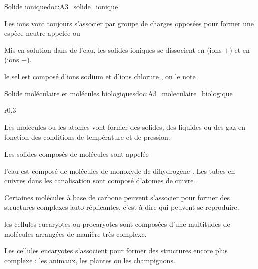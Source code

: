 \begin{doc}{Solide ionique}{doc:A3_solide_ionique}
  \begin{importants}
    Les ions vont toujours s'associer par groupe de charges opposées pour former une espèce neutre appelée  ou 
  \end{importants}
  
  Mis en solution dans de l'eau, les solides ioniques se dissocient en  (ions $+$) et en  (ions $-$).
  
  \exemple le sel est composé d'ions sodium  et d'ions chlorure , on le note .
\end{doc}



\begin{doc}{Solide moléculaire et molécules biologiques}{doc:A3_moleculaire_biologique}
  \vspace*{-16pt}
  \begin{wrapfigure}{r}{0.3\linewidth}
    \vspace*{-22pt}
    \centering
  
  \end{wrapfigure}
  \phantom{bla}
  
  \begin{importants}
    Les molécules ou les atomes vont former des solides, des liquides ou des gaz en fonction des conditions de température et de pression.

    Les solides composés de molécules sont appelée 
  \end{importants}
  \exemple l'eau est composé de molécules de monoxyde de dihydrogène .
  Les tubes en cuivres dans les canalisation sont composé d'atomes de cuivre .
  
  \begin{importants}
    Certaines molécules à base de carbone peuvent s'associer pour former des structures complexes auto-réplicantes, c'est-à-dire qui peuvent se reproduire.
  \end{importants}
  \exemple les cellules eucaryotes ou procaryotes sont composées d'une multitudes de molécules arrangées de manière très complexe.

  \begin{importants}
    Les cellules eucaryotes s'associent pour former des structures encore plus complexe : les animaux, les plantes ou les champignons.
  \end{importants}
\end{doc}